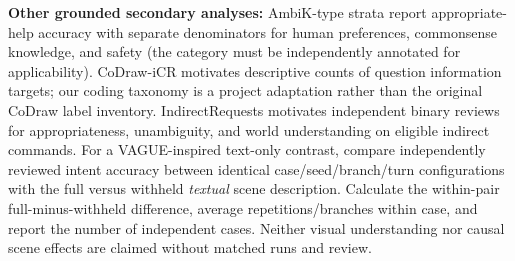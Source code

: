 \documentclass[10pt,conference]{IEEEtran}
\begin{document}
\textbf{Other grounded secondary analyses:} AmbiK-type strata report appropriate-help accuracy with separate denominators for human preferences, commonsense knowledge, and safety (the category must be independently annotated for applicability). CoDraw-iCR motivates descriptive counts of question information targets; our coding taxonomy is a project adaptation rather than the original CoDraw label inventory. IndirectRequests motivates independent binary reviews for appropriateness, unambiguity, and world understanding on eligible indirect commands. For a VAGUE-inspired text-only contrast, compare independently reviewed intent accuracy between identical case/seed/branch/turn configurations with the full versus withheld \emph{textual} scene description. Calculate the within-pair full-minus-withheld difference, average repetitions/branches within case, and report the number of independent cases. Neither visual understanding nor causal scene effects are claimed without matched runs and review.
\end{document}
